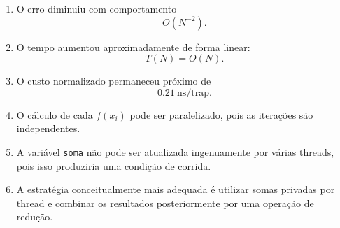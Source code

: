 \begin{enumerate}
    \item O erro diminuiu com comportamento
    \[
        O(N^{-2}).
    \]

    \item O tempo aumentou aproximadamente de forma linear:
    \[
        T(N)=O(N).
    \]

    \item O custo normalizado permaneceu próximo de
    \[
        0.21\ \text{ns/trap}.
    \]

    \item O cálculo de cada \(f(x_i)\) pode ser paralelizado, pois as
    iterações são independentes.

    \item A variável \texttt{soma} não pode ser atualizada ingenuamente por
    várias threads, pois isso produziria uma condição de corrida.

    \item A estratégia conceitualmente mais adequada é utilizar somas
    privadas por thread e combinar os resultados posteriormente por uma
    operação de redução.
\end{enumerate}
